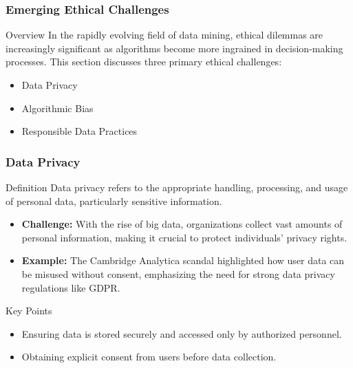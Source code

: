 \documentclass[aspectratio=169]{beamer}
\begin{document}
\begin{frame}[fragile]
    \frametitle{Emerging Ethical Challenges}
    \begin{block}{Overview}
        In the rapidly evolving field of data mining, ethical dilemmas are increasingly significant as algorithms become more ingrained in decision-making processes. 
        This section discusses three primary ethical challenges: 
        \begin{itemize}
            \item Data Privacy
            \item Algorithmic Bias
            \item Responsible Data Practices
        \end{itemize}
    \end{block}
\end{frame}

\begin{frame}[fragile]
    \frametitle{Data Privacy}
    \begin{block}{Definition}
        Data privacy refers to the appropriate handling, processing, and usage of personal data, particularly sensitive information.
    \end{block}

    \begin{itemize}
        \item \textbf{Challenge:} With the rise of big data, organizations collect vast amounts of personal information, making it crucial to protect individuals’ privacy rights. 
        \item \textbf{Example:} The Cambridge Analytica scandal highlighted how user data can be misused without consent, emphasizing the need for strong data privacy regulations like GDPR.
    \end{itemize}

    \begin{block}{Key Points}
        \begin{itemize}
            \item Ensuring data is stored securely and accessed only by authorized personnel.
            \item Obtaining explicit consent from users before data collection.
        \end{itemize}
    \end{block}
\end{frame}
\end{document}
